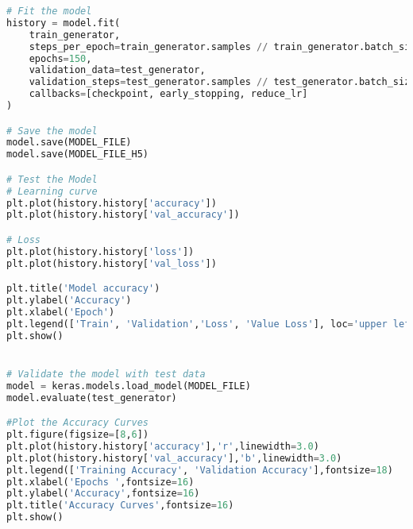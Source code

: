 \begin{lstlisting}[language=Python]
# Fit the model
history = model.fit(
    train_generator,
    steps_per_epoch=train_generator.samples // train_generator.batch_size,
    epochs=150,
    validation_data=test_generator,
    validation_steps=test_generator.samples // test_generator.batch_size,
    callbacks=[checkpoint, early_stopping, reduce_lr]
)

# Save the model
model.save(MODEL_FILE)
model.save(MODEL_FILE_H5)

# Test the Model
# Learning curve
plt.plot(history.history['accuracy'])
plt.plot(history.history['val_accuracy'])

# Loss
plt.plot(history.history['loss'])
plt.plot(history.history['val_loss'])

plt.title('Model accuracy')
plt.ylabel('Accuracy')
plt.xlabel('Epoch')
plt.legend(['Train', 'Validation','Loss', 'Value Loss'], loc='upper left')
plt.show()


# Validate the model with test data
model = keras.models.load_model(MODEL_FILE)
model.evaluate(test_generator)

#Plot the Accuracy Curves
plt.figure(figsize=[8,6])
plt.plot(history.history['accuracy'],'r',linewidth=3.0)
plt.plot(history.history['val_accuracy'],'b',linewidth=3.0)
plt.legend(['Training Accuracy', 'Validation Accuracy'],fontsize=18)
plt.xlabel('Epochs ',fontsize=16)
plt.ylabel('Accuracy',fontsize=16)
plt.title('Accuracy Curves',fontsize=16)
plt.show()

\end{lstlisting}
